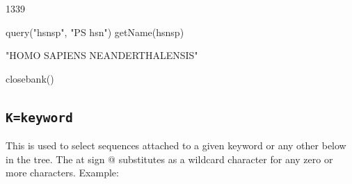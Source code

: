 \documentclass{article}
\begin{document}

\begin{Schunk}
\begin{Soutput}
[1] 1339
\end{Soutput}
\begin{Sinput}
 query("hsnsp", "PS hsn")
 getName(hsnsp)
\end{Sinput}
\begin{Soutput}
[1] "HOMO SAPIENS NEANDERTHALENSIS"
\end{Soutput}
\begin{Sinput}
 closebank()
\end{Sinput}
\end{Schunk}

\subsection{\texttt{K=keyword}}

This is used to select sequences attached to a given keyword or any other below in
the tree. The at sign @ substitutes as a wildcard character for any zero or more 
characters. Example:
\end{document}
